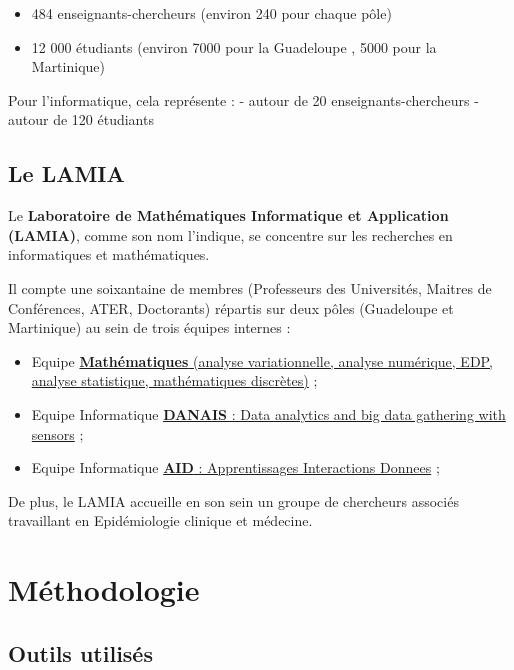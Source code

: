 \begin{itemize}
\tightlist
\item
  484 enseignants-chercheurs (environ 240 pour chaque pôle)
\item
  12 000 étudiants (environ 7000 pour la Guadeloupe , 5000 pour la
  Martinique)
\end{itemize}

Pour l'informatique, cela représente : - autour de 20
enseignants-chercheurs - autour de 120 étudiants

\hypertarget{le-lamia}{%
\subsection{Le LAMIA}\label{le-lamia}}

Le \textbf{Laboratoire de Mathématiques Informatique et Application
(LAMIA)}, comme son nom l'indique, se concentre sur les recherches en
informatiques et mathématiques.

Il compte une soixantaine de membres (Professeurs des Universités,
Maitres de Conférences, ATER, Doctorants) répartis sur deux pôles
(Guadeloupe et Martinique) au sein de trois équipes internes :

\begin{itemize}
\tightlist
\item
  Equipe
  \href{http://lamia.univ-ag.fr/index.php?page=equipe-mathematiques}{\textbf{Mathématiques}
  (analyse variationnelle, analyse numérique, EDP, analyse statistique,
  mathématiques discrètes)} ;
\item
  Equipe Informatique
  \href{http://lamia.univ-ag.fr/index.php?page=equipe-danais}{\textbf{DANAIS}
  : Data analytics and big data gathering with sensors} ;
\item
  Equipe Informatique
  \href{http://lamia.univ-ag.fr/index.php?page=equipe-aid}{\textbf{AID}
  : Apprentissages Interactions Donnees} ;
\end{itemize}

De plus, le LAMIA accueille en son sein un groupe de chercheurs associés
travaillant en Epidémiologie clinique et médecine.




\hypertarget{Méthodologie}{
\section{Méthodologie}\label{Méthodologie}}
\subsection{Outils utilisés}



